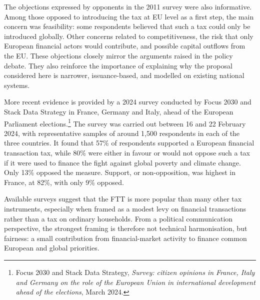 \documentclass[../../main]{subfiles}
\begin{document}
The objections expressed by opponents in the 2011 survey were also informative. Among those opposed to introducing the tax at EU level as a first step, the main concern was feasibility: some respondents believed that such a tax could only be introduced globally. Other concerns related to competitiveness, the risk that only European financial actors would contribute, and possible capital outflows from the EU. These objections closely mirror the arguments raised in the policy debate. They also reinforce the importance of explaining why the proposal considered here is narrower, issuance-based, and modelled on existing national systems.

More recent evidence is provided by a 2024 survey conducted by Focus 2030 and Stack Data Strategy in France, Germany and Italy, ahead of the European Parliament elections.\footnote{Focus 2030 and Stack Data Strategy, \textit{Survey: citizen opinions in France, Italy and Germany on the role of the European Union in international development ahead of the elections}, March 2024.} The survey was carried out between 16 and 22 February 2024, with representative samples of around 1,500 respondents in each of the three countries. It found that 57\% of respondents supported a European financial transaction tax, while 80\% were either in favour or would not oppose such a tax if it were used to finance the fight against global poverty and climate change. Only 13\% opposed the measure. Support, or non-opposition, was highest in France, at 82\%, with only 9\% opposed.


Available surveys suggest that the FTT is more popular than many other tax instruments, especially when framed as a modest levy on financial transactions rather than a tax on ordinary households. From a political communication perspective, the strongest framing is therefore not technical harmonisation, but fairness: a small contribution from financial-market activity to finance common European and global priorities.
\end{document}
